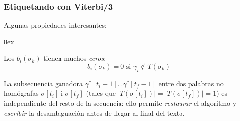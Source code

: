 \documentclass{beamer}
\begin{document}
\begin{frame}
\frametitle{ Etiquetando con Viterbi/3}

{
{Algunas propiedades interesantes:}
\begin{itemize}\itemsep 0ex
{\item Los \(b_i(\sigma_k)\) tienen muchos \emph{ceros}:
       \[ b_i(\sigma_k)=0 \mbox{ si } \gamma_i\not\in T(\sigma_k) \]
}
{\item La subsecuencia ganadora \(\gamma^*[t_i+1]...\gamma^*[t_f-1]
\) entre dos palabras no homógrafas \(\sigma[t_i]\) i \(\sigma[t_f]\) (tales
que \(|T(\sigma[t_i])|=|T(\sigma[t_f])|=1\)) es independiente del resto de la secuencia: ello permite \emph{restaurar} el algoritmo y \emph{escribir}
la desambiguación antes de llegar al final del texto.}

\end{itemize}
}
\end{frame}
\end{document}
